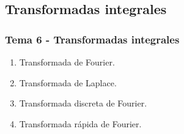 \documentclass[12pt]{beamer}
\begin{document}
\subsection{Transformadas integrales}

\begin{frame}
\frametitle{Tema 6 - Transformadas integrales}
\begin{enumerate}[<+->]
\item Transformada de Fourier.
\item Transformada de Laplace.
\item Transformada discreta de Fourier.
\item Transformada rápida de Fourier.
\end{enumerate}
\end{frame}


% 

\end{document}
